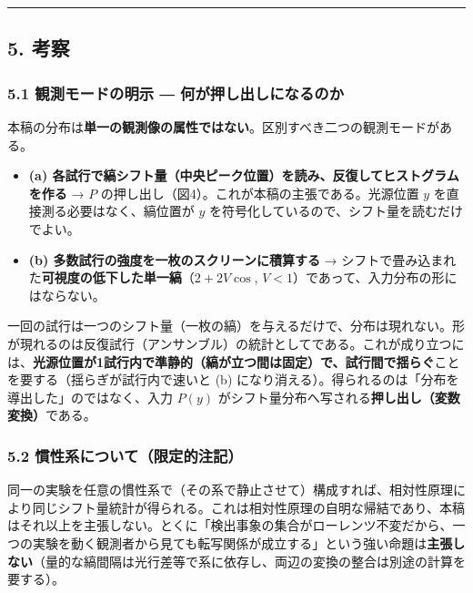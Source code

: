 \documentclass[
]{ltjsarticle}
\providecommand{\tightlist}{%
  \setlength{\itemsep}{0pt}\setlength{\parskip}{0pt}}
\begin{document}
\begin{center}\rule{0.5\linewidth}{0.5pt}\end{center}

\subsection{5. 考察}\label{ux8003ux5bdf}

\subsubsection{5.1 観測モードの明示 ―
何が押し出しになるのか}\label{ux89b3ux6e2cux30e2ux30fcux30c9ux306eux660eux793a-ux4f55ux304cux62bcux3057ux51faux3057ux306bux306aux308bux306eux304b}

本稿の分布は\textbf{単一の観測像の属性ではない}。区別すべき二つの観測モードがある。

\begin{itemize}
\tightlist
\item
  \textbf{(a)
  各試行で縞シフト量（中央ピーク位置）を読み、反復してヒストグラムを作る}
  → \(P\) の押し出し（図4）。これが本稿の主張である。光源位置 \(y\)
  を直接測る必要はなく、縞位置が \(y\)
  を符号化しているので、シフト量を読むだけでよい。
\item
  \textbf{(b) 多数試行の強度を一枚のスクリーンに積算する} →
  シフトで畳み込まれた\textbf{可視度の低下した単一縞}（\(2+2V\cos\),
  \(V<1\)）であって、入力分布の形にはならない。
\end{itemize}

一回の試行は一つのシフト量（一枚の縞）を与えるだけで、分布は現れない。形が現れるのは反復試行（アンサンブル）の統計としてである。これが成り立つには、\textbf{光源位置が1試行内で準静的（縞が立つ間は固定）で、試行間で揺らぐ}ことを要する（揺らぎが試行内で速いと
(b) になり消える）。得られるのは「分布を導出した」のではなく、入力
\(P(y)\) がシフト量分布へ写される\textbf{押し出し（変数変換）}である。

\subsubsection{5.2
慣性系について（限定的注記）}\label{ux6163ux6027ux7cfbux306bux3064ux3044ux3066ux9650ux5b9aux7684ux6ce8ux8a18}

同一の実験を任意の慣性系で（その系で静止させて）構成すれば、相対性原理により同じシフト量統計が得られる。これは相対性原理の自明な帰結であり、本稿はそれ以上を主張しない。とくに「検出事象の集合がローレンツ不変だから、一つの実験を動く観測者から見ても転写関係が成立する」という強い命題は\textbf{主張しない}（量的な縞間隔は光行差等で系に依存し、両辺の変換の整合は別途の計算を要する）。
\end{document}
